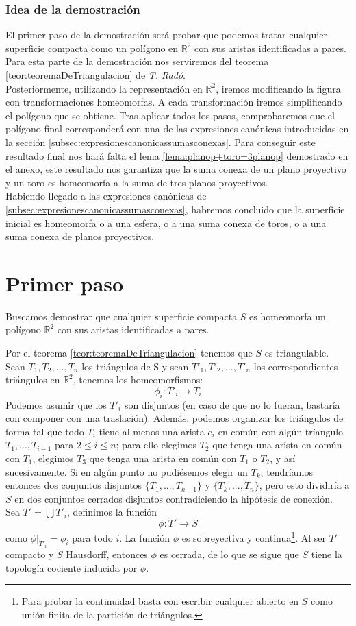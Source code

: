 \documentclass[a4paper,11pt,spanish, twoside, leqno]{tfg-uam}
\newcommand*{\reales}{\mathbb{R}}
\theoremstyle{definition}
\begin{document}
\subsubsection*{Idea de la demostración}
El primer paso de la demostración será probar que podemos tratar cualquier superficie compacta como un polígono en $\reales^2$ con sus aristas identificadas a pares. Para esta parte de la demostración nos serviremos del teorema \ref{teor:teoremaDeTriangulacion} de \textit{T. Radó}.\\
Posteriormente, utilizando la representación en $\reales^2$, iremos modificando la figura con transformaciones homeomorfas. A cada transformación iremos simplificando el polígono que se obtiene. Tras aplicar todos los pasos, comprobaremos que el polígono final corresponderá con una de las expresiones canónicas introducidas en la sección \ref{subsec:expresionescanonicassumasconexas}. Para conseguir este resultado final nos hará falta el lema \ref{lema:planop+toro=3planop} demostrado en el anexo, este resultado nos garantiza que la suma conexa de un plano proyectivo y un toro es homeomorfa a la suma de tres planos proyectivos.\\
Habiendo llegado a las expresiones canónicas de \ref{subsec:expresionescanonicassumasconexas}, habremos concluido que la superficie inicial es homeomorfa o a una esfera, o a una suma conexa de toros, o a una suma conexa de planos proyectivos.\\

\section{Primer paso}
Buscamos demostrar que cualquier superficie compacta $S$ es homeomorfa un polígono $\reales^2$ con sus aristas identificadas a pares.

Por el teorema \ref{teor:teoremaDeTriangulacion} tenemos que $S$ es triangulable. Sean $T_1, T_2, ..., T_n$ los triángulos de S y sean $T'_1, T'_2, ...,  T'_n$ los correspondientes triángulos en $\reales^2$, tenemos los homeomorfismos:
\[ \phi_i: T'_i \longrightarrow T_i \]
Podemos asumir que los $T'_i$ son disjuntos (en caso de que no lo fueran, bastaría con componer con una traslación). Además, podemos organizar los triángulos de forma tal que todo $T_i$ tiene al menos una arista $e_i$ en común con algún tríangulo $T_1, ..., T_{i-1}$ para $2\leq i \leq n$; para ello elegimos $T_2$ que tenga una arista en común con $T_1$, elegimos $T_3$ que tenga una arista en común con $T_1$ o $T_2$, y así sucesivamente. Si en algún punto no pudiésemos elegir un $T_k$, tendríamos entonces dos conjuntos disjuntos $\{T_1, ..., T_{k-1} \}$ y $\{T_k, ..., T_n\}$, pero esto dividiría a $S$ en dos conjuntos cerrados disjuntos contradiciendo la hipótesis de conexión.\\
Sea $T' = \bigcup T'_i$, definimos la función 
\[ \phi: T' \longrightarrow S \]
como $\phi |_{T'_i} = \phi_i$ para todo $i$. La función $\phi$ es sobreyectiva y continua\footnote{Para probar la continuidad basta con escribir cualquier abierto en $S$ como unión finita de la partición de triángulos.}. Al ser $T'$ compacto y $S$ Hausdorff, entonces $\phi$ es cerrada, de lo que se sigue que $S$ tiene la topología cociente inducida por $\phi$.
\end{document}

